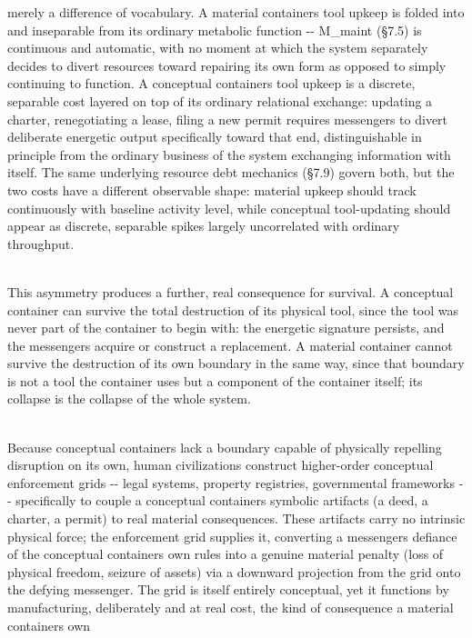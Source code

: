 \documentclass[
]{article}
\begin{document}
merely a difference of vocabulary. A material
container\textquotesingle s tool upkeep is folded into and inseparable
from its ordinary metabolic function -\/- M\_maint (§7.5) is continuous
and automatic, with no moment at which the system separately decides to
divert resources toward repairing its own form as opposed to simply
continuing to function. A conceptual container\textquotesingle s tool
upkeep is a discrete, separable cost layered on top of its ordinary
relational exchange: updating a charter, renegotiating a lease, filing a
new permit requires messengers to divert deliberate energetic output
specifically toward that end, distinguishable in principle from the
ordinary business of the system exchanging information with itself. The
same underlying resource debt mechanics (§7.9) govern both, but the two
costs have a different observable shape: material upkeep should track
continuously with baseline activity level, while conceptual
tool-updating should appear as discrete, separable spikes largely
uncorrelated with ordinary throughput.\\
\strut \\
This asymmetry produces a further, real consequence for survival. A
conceptual container can survive the total destruction of its physical
tool, since the tool was never part of the container to begin with: the
energetic signature persists, and the messengers acquire or construct a
replacement. A material container cannot survive the destruction of its
own boundary in the same way, since that boundary is not a tool the
container uses but a component of the container itself; its collapse is
the collapse of the whole system.\\
\strut \\
Because conceptual containers lack a boundary capable of physically
repelling disruption on its own, human civilizations construct
higher-order conceptual enforcement grids -\/- legal systems, property
registries, governmental frameworks -\/- specifically to couple a
conceptual container\textquotesingle s symbolic artifacts (a deed, a
charter, a permit) to real material consequences. These artifacts carry
no intrinsic physical force; the enforcement grid supplies it,
converting a messenger\textquotesingle s defiance of the conceptual
container\textquotesingle s own rules into a genuine material penalty
(loss of physical freedom, seizure of assets) via a downward projection
from the grid onto the defying messenger. The grid is itself entirely
conceptual, yet it functions by manufacturing, deliberately and at real
cost, the kind of consequence a material container\textquotesingle s own
\end{document}
